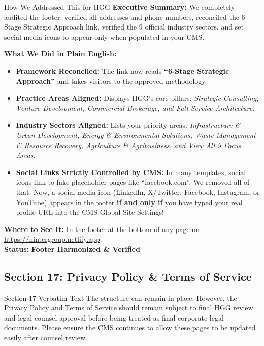 \documentclass[11pt,a4paper]{article}
\begin{document}
\begin{DetailedResolutionBox}{How We Addressed This for HGG}
\textbf{Executive Summary:} We completely audited the footer: verified all addresses and phone numbers, reconciled the 6-Stage Strategic Approach link, verified the 9 official industry sectors, and set social media icons to appear only when populated in your CMS.

\textbf{What We Did in Plain English:}
\begin{itemize}
    \item \textbf{Framework Reconciled:} The link now reads \textbf{``6-Stage Strategic Approach''} and takes visitors to the approved methodology.
    \item \textbf{Practice Areas Aligned:} Displays HGG's core pillars: \textit{Strategic Consulting, Venture Development, Commercial Brokerage, and Full Service Architecture}.
    \item \textbf{Industry Sectors Aligned:} Lists your priority areas: \textit{Infrastructure \& Urban Development, Energy \& Environmental Solutions, Waste Management \& Resource Recovery, Agriculture \& Agribusiness, and View All 9 Focus Areas}.
    \item \textbf{Social Links Strictly Controlled by CMS:} In many templates, social icons link to fake placeholder pages like ``facebook.com''. We removed all of that. Now, a social media icon (LinkedIn, X/Twitter, Facebook, Instagram, or YouTube) appears in the footer \textbf{if and only if} you have typed your real profile URL into the CMS Global Site Settings!
\end{itemize}

\textbf{Where to See It:} In the footer at the bottom of any page on \url{https://hintergroup.netlify.app}. \\
\textbf{Status:} \textcolor{HGGGreen}{\textbf{Footer Harmonized \& Verified}}
\end{DetailedResolutionBox}

\vspace{0.3cm}

\subsection{Section 17: Privacy Policy \& Terms of Service}

\begin{VerbatimClientBox}{Section 17 Verbatim Text}
The structure can remain in place.
However, the Privacy Policy and Terms of Service should remain subject to final HGG review and legal-counsel approval before being treated as final corporate legal documents.
Please ensure the CMS continues to allow these pages to be updated easily after counsel review.
\end{VerbatimClientBox}
\end{document}
